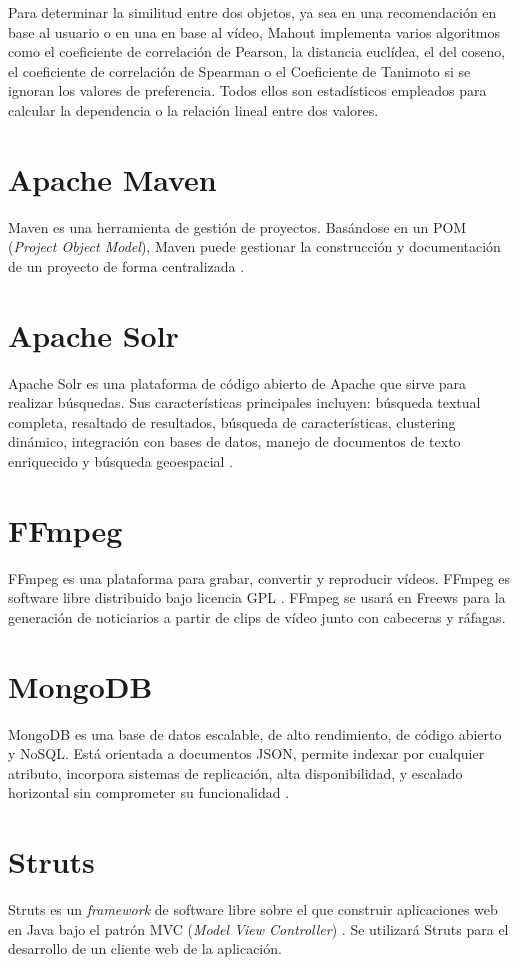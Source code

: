 \documentclass[11pt]{book}
\begin{document}
Para determinar la similitud entre dos objetos, ya sea en una recomendación en base al usuario o en una en base al vídeo, Mahout implementa varios algoritmos como el coeficiente de correlación de Pearson, la distancia euclídea, el del coseno, el coeficiente de correlación de Spearman o el Coeficiente de Tanimoto si se ignoran los valores de preferencia. Todos ellos son estadísticos empleados para calcular la dependencia o la relación lineal entre dos valores.
\section{Apache Maven}
Maven es una herramienta de gestión de proyectos. Basándose en un POM (\textit{Project Object Model}), Maven puede gestionar la construcción y documentación de un proyecto de forma centralizada \cite{maven}.
\section{Apache Solr}
Apache Solr es una plataforma de código abierto de Apache que sirve para realizar búsquedas. Sus características principales incluyen: búsqueda textual completa, resaltado de resultados, búsqueda de características, clustering dinámico, integración con bases de datos, manejo de documentos de texto enriquecido y búsqueda geoespacial \cite{solr}.
\section{FFmpeg}
FFmpeg es una plataforma para grabar, convertir y reproducir vídeos. FFmpeg es software libre distribuido bajo licencia GPL \cite{ffmpeg}. FFmpeg se usará en Freews para la generación de noticiarios a partir de clips de vídeo junto con cabeceras y ráfagas.
\section{MongoDB}
MongoDB es una base de datos escalable, de alto rendimiento, de código abierto y NoSQL. Está orientada a documentos JSON, permite indexar por cualquier atributo, incorpora sistemas de replicación, alta disponibilidad, y escalado horizontal sin comprometer su funcionalidad \cite{mongodb}.
\section{Struts}
Struts es un \textit{framework} de software libre sobre el que construir aplicaciones web en Java bajo el patrón MVC (\textit{Model View Controller}) \cite{struts}. Se utilizará Struts para el desarrollo de un cliente web de la aplicación.
\end{document}
